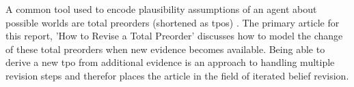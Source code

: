 \documentclass[11pt]{scrartcl}
\begin{document}
A common tool used to encode plausibility assumptions of an agent about possible worlds are total preorders (shortened as tpos) \cite{Booth2011}. The primary article for this report, 'How to Revise a Total Preorder' discusses how to model the change of these total preorders when new evidence becomes available. Being able to derive a new tpo from additional evidence is an approach to handling multiple revision steps and therefor places the article in the field of iterated belief revision.
%
\end{document}
